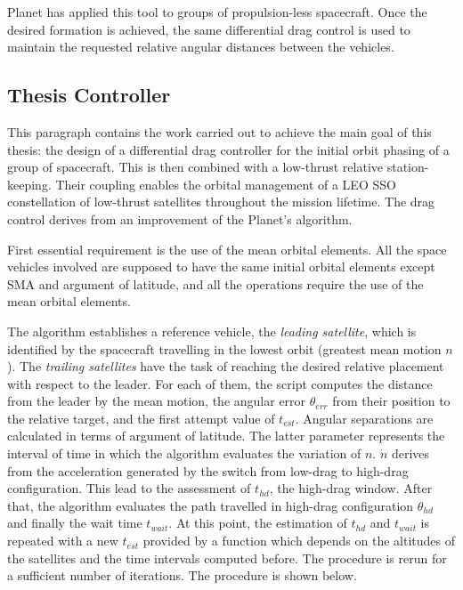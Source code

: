 \begin{itemize}
Planet has applied this tool to groups of propulsion-less spacecraft.
Once the desired formation is achieved, the same differential drag control is used to maintain the requested relative angular distances between the vehicles.



\subsection{Thesis Controller}
This paragraph contains the work carried out to achieve the main goal of this thesis: the design of a differential drag controller for the initial orbit phasing of a group of spacecraft.
This is then combined with a low-thrust relative station-keeping.
Their coupling enables the orbital management of a LEO SSO constellation of low-thrust satellites throughout the mission lifetime. 
The drag control derives from an improvement of the Planet's algorithm.

First essential requirement is the use of the mean orbital elements.
All the space vehicles involved are supposed to have the same initial orbital elements except SMA and argument of latitude, and all the operations require the use of the mean orbital elements.

The algorithm establishes a reference vehicle, the \textit{leading satellite}, which is identified by the spacecraft travelling in the lowest orbit (greatest mean motion $n$).
The \textit{trailing satellites} have the task of reaching the desired relative placement with respect to the leader.
For each of them, the script computes the distance from the leader by the mean motion, the angular error $\theta_{err}$ from their position to the relative target, and the first attempt value of $t_{est}$.
Angular separations are calculated in terms of argument of latitude.
The latter parameter represents the interval of time in which the algorithm evaluates the variation of $n$.
$\dot{n}$ derives from the acceleration generated by the switch from low-drag to high-drag configuration.
This lead to the assessment of $t_{hd}$, the high-drag window.
After that, the algorithm evaluates the path travelled in high-drag configuration $\theta_{hd}$ and finally the wait time $t_{wait}.$ 
At this point, the estimation of $t_{hd}$ and $t_{wait}$ is repeated with a new $t_{est}$ provided by a function which depends on the altitudes of the satellites and the time intervals computed before.
The procedure is rerun for a sufficient number of iterations.
The procedure is shown below.


\end{itemize}
